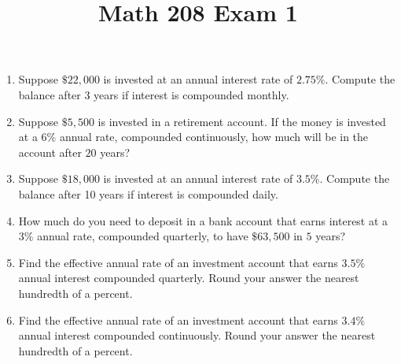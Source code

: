 \documentclass[11pt]{article} %
\title{Math 208 Exam 1}
\date{} %
\begin{document}
\maketitle
\begin{enumerate}
\item Suppose $\$22,000$ is invested at an annual interest rate of $2.75\%.$ Compute the balance after 3 years if interest is compounded monthly.
\item Suppose $\$5,500$ is invested in a retirement account. If the money is invested at a $6\%$ annual rate, compounded continuously, how much will be in the account after $20$ years? 
\item Suppose $\$18,000$ is invested at an annual interest rate of $3.5\%.$ Compute the balance after 10 years if interest is compounded daily.
\item How much do you need to deposit in a bank account that earns interest at a $3\%$ annual rate, compounded quarterly, to have $\$63,500$ in $5$ years?
\item Find the effective annual rate of an investment account that earns $3.5\%$ annual interest compounded quarterly. Round your answer the nearest hundredth of a percent.  
\item Find the effective annual rate of an investment account that earns $3.4\%$ annual interest compounded continuously. Round your answer the nearest hundredth of a percent.  


\end{enumerate}
\end{document}

